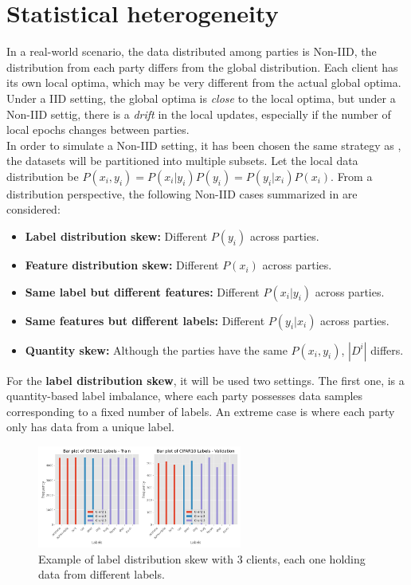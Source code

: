 \section{Statistical heterogeneity}
\label{sec:statistical_heterogeneity}

In a real-world scenario, the data distributed among parties is Non-IID, the distribution from each party differs from the global distribution. Each client has its own local optima, which may be very different from the actual global optima.
Under a IID setting, the global optima is \textit{close} to the local optima, but under a Non-IID settig, there is a \textit{drift} in the local updates, especially if the number of local epochs changes between parties.\\

In order to simulate a Non-IID setting, it has been chosen the same strategy as \cite{li2021}, the datasets will be partitioned into multiple subsets. Let the local data distribution be $P(x_i, y_i) = P(x_i|y_i)P(y_i) = P(y_i | x_i)P(x_i)$. From a distribution perspective, the following Non-IID cases summarized in \cite{kairouz2021} are considered:

\begin{itemize}
  \item \textbf{Label distribution skew:} Different $P(y_i)$ across parties.
  \item \textbf{Feature distribution skew:} Different $P(x_i)$ across parties.
  \item \textbf{Same label but different features:} Different $P(x_i | y_i)$ across parties.
  \item \textbf{Same features but different labels:} Different $P(y_i | x_i)$ across parties.
  \item \textbf{Quantity skew:} Although the parties have the same $P(x_i, y_i)$, $|D^i|$ differs.
\end{itemize}

For the \textbf{label distribution skew}, it will be used two settings. The first one, is a quantity-based label imbalance, where each party possesses data samples corresponding to a fixed number of labels. An extreme case is where each party only has data from a unique label.

\begin{figure}[H]
  \centering
  \includegraphics[width=0.6\textwidth]{figures/2-Federated_Learning/Example_Quantity_based_3_clients.png}
  \caption{Example of label distribution skew with 3 clients, each one holding data from different labels.}
  \label{fig:label_distribution_skew}
\end{figure}


